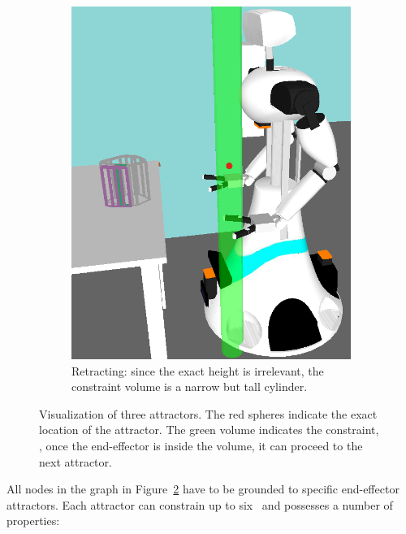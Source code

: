 \begin{figure}[ht]
\begin{subfigure}[t]{0.3\linewidth}
		\includegraphics[width = 1\linewidth]{pics/TopologicalRetract_emphsphere}
		\caption{Retracting: since the exact height is irrelevant, the constraint volume is a narrow but tall cylinder.}
		\label{wbp:fig:topretract}
	\end{subfigure}	
	\caption{Visualization of three attractors. The red spheres indicate the exact location of the attractor. The green volume indicates the constraint, \ie, once the end-effector is inside the volume, it can proceed to the next attractor.}
	\label{wbp:fig:constraints}
\end{figure}
All nodes in the graph in Figure~\ref{wbp:fig:constraints} have to be grounded to specific end-effector attractors. Each attractor can constrain up to six \dofs\ and possesses a number of properties:

